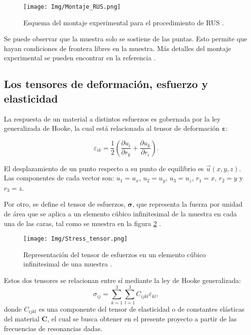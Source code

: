 \documentclass[12pt]{article}
\begin{document}
\begin{figure}[H]
    \centering
    \texttt{[image: Img/Montaje\_RUS.png]}
    \caption{Esquema del montaje experimental para el procedimiento de RUS \cite{Leisure_1997}.}
    \label{fig:montaje_rus}
\end{figure}

Se puede observar que la muestra solo se sostiene de las puntas. Esto permite que hayan condiciones de frontera libres en la muestra. Más detalles del montaje experimental se pueden encontrar en la referencia \cite{MIGLIORI19931}.

\subsection{Los tensores de deformación, esfuerzo y elasticidad}

La respuesta de un material a distintos esfuerzos es gobernada por la ley generalizada de Hooke, la cual está relacionada al tensor de deformación $\bm{\varepsilon}$:

\begin{equation}
    \varepsilon_{ik} = \frac{1}{2} \left(\frac{\partial u_i}{\partial r_k} + \frac{\partial u_k}{\partial r_i} \right).
	\label{eq:deformación}
\end{equation}

El desplazamiento de un punto respecto a su punto de equilibrio es $\vec{u}{(x,y,z)}$. Las componentes de cada vector son: $u_1 = u_x$, $u_2 = u_y$, $u_3 = u_z$, $r_1 = x$, $r_2 = y$ y $r_3 = z$.

Por otro, se define el tensor de esfuerzos, $\bm{\sigma}$, que representa la fuerza por unidad de área que se aplica a un elemento cúbico infinitesimal de la muestra en cada una de las caras, tal como se muestra en la figura \ref{fig:tensor_esfuerzos} \cite{oliveira2020}.

\begin{figure}[H]
    \centering
    \texttt{[image: Img/Stress\_tensor.png]}
    \caption{Representación del tensor de esfuerzos en un elemento cúbico infinitesimal de una muestra \cite{oliveira2020}.}
    \label{fig:tensor_esfuerzos}
\end{figure}

Estos dos tensores se relacionan entre sí mediante la ley de Hooke generalizada:
\begin{equation}
	\sigma_{ij} = \sum_{k=1}^{3}\sum_{l=1}^{3}C_{ijkl}\varepsilon_{kl},
\end{equation}
donde $C_{ijkl}$ es una componente del tensor de elasticidad o de constantes elásticas del material $\bm{C}$, el cual se busca obtener en el presente proyecto a partir de las frecuencias de resonancias dadas. 
\end{document}
